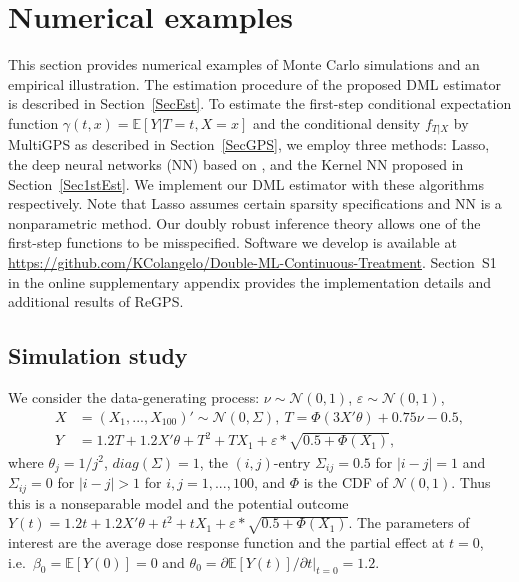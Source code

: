 \documentclass[lettersize, 12pt]{article}
\begin{document}
\section{Numerical examples}
\label{SecNEx}
This section provides numerical examples of Monte Carlo simulations and an empirical illustration.
The estimation procedure of the proposed DML estimator is described in Section~\ref{SecEst}.
To estimate the first-step conditional expectation function $\gamma(t,x) = \mathbb{E}[Y|T=t, X=x]$ and the conditional density $f_{T|X}$ by MultiGPS as described in Section~\ref{SecGPS}, we employ three methods: Lasso,
the deep neural networks (NN) based on \cite{Farrell18},
and the Kernel NN proposed in Section~\ref{Sec1stEst}. 
We implement our DML estimator with these algorithms respectively.
Note that Lasso assumes certain sparsity specifications and NN is a nonparametric method.  Our doubly robust inference theory allows one of the first-step functions to be misspecified.
Software we develop is available at \url{https://github.com/KColangelo/Double-ML-Continuous-Treatment}.
Section~S1 in the online supplementary appendix provides the implementation details and additional results of ReGPS.


\subsection{Simulation study}
\label{SecMC}
We consider the data-generating process:
$\nu \sim \mathcal{N}(0,1)$,  $\varepsilon \sim \mathcal{N}(0,1)$, 
\begin{align*}
X &= (X_1,...,X_{100})' \sim \mathcal{N}(0,\Sigma), \ 
T = \Phi(3 X'\theta) + 0.75\nu - 0.5,   
\\ 
Y &= 1.2T + 1.2 X'\theta +  T^2 + TX_1 + \varepsilon*\sqrt{0.5+\Phi(X_1)}, 
\end{align*}
where 
$\theta_j = 1/j^2$,
$diag(\Sigma) = 1$, the $(i,j)$-entry $\Sigma_{ij} = 0.5$ for $|i-j|=1$ and $\Sigma_{ij} = 0$ for $|i-j|>1$  for $i,j=1,...,100$,
and $\Phi$ is the CDF of $\mathcal{N}(0,1)$.
Thus this is a nonseparable model and the potential outcome $Y(t) = 1.2t + 1.2 X'\theta +  t^2 + tX_1 + \varepsilon*\sqrt{0.5+\Phi(X_1)}$.
The parameters of interest are the average dose response function and the partial effect at $t = 0$, i.e.\ $\beta_0 = \mathbb{E}[Y(0)] = 0$ and $\theta_0 = \partial \mathbb{E}[Y(t)]/\partial t|_{t=0} = 1.2$.
\end{document}
